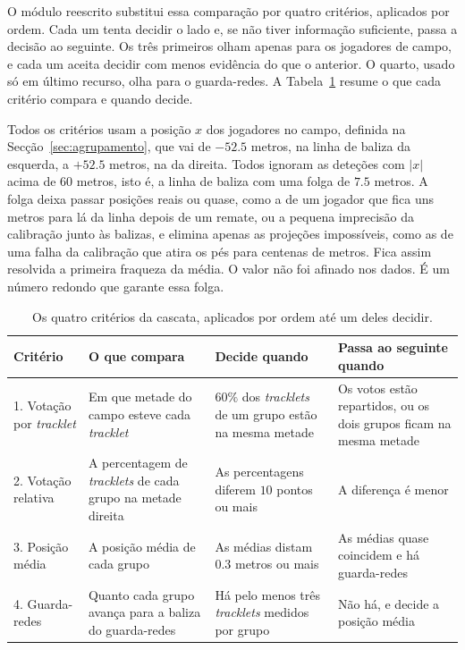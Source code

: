 O módulo reescrito substitui essa comparação por quatro critérios, aplicados por ordem. Cada um tenta decidir o lado e, se não tiver informação suficiente, passa a decisão ao seguinte. Os três primeiros olham apenas para os jogadores de campo, e cada um aceita decidir com menos evidência do que o anterior. O quarto, usado só em último recurso, olha para o guarda-redes. A Tabela~\ref{tab:cascata} resume o que cada critério compara e quando decide.

Todos os critérios usam a posição $x$ dos jogadores no campo, definida na Secção~\ref{sec:agrupamento}, que vai de $-52.5$ metros, na linha de baliza da esquerda, a $+52.5$ metros, na da direita. Todos ignoram as deteções com $|x|$ acima de $60$ metros, isto é, a linha de baliza com uma folga de $7.5$ metros. A folga deixa passar posições reais ou quase, como a de um jogador que fica uns metros para lá da linha depois de um remate, ou a pequena imprecisão da calibração junto às balizas, e elimina apenas as projeções impossíveis, como as de uma falha da calibração que atira os pés para centenas de metros. Fica assim resolvida a primeira fraqueza da média. O valor não foi afinado nos dados. É um número redondo que garante essa folga.

\begin{table}[H]
    \centering
    \caption{Os quatro critérios da cascata, aplicados por ordem até um deles decidir.}
    \label{tab:cascata}
    \small
    \begin{tabular}{|l|p{3.6cm}|p{3.2cm}|p{3.2cm}|}
        \hline
        \textbf{Critério} & \textbf{O que compara} & \textbf{Decide quando} & \textbf{Passa ao seguinte quando} \\
        \hline
        1. Votação por \emph{tracklet} & Em que metade do campo esteve cada \emph{tracklet} & $60\%$ dos \emph{tracklets} de um grupo estão na mesma metade & Os votos estão repartidos, ou os dois grupos ficam na mesma metade \\
        \hline
        2. Votação relativa & A percentagem de \emph{tracklets} de cada grupo na metade direita & As percentagens diferem $10$ pontos ou mais & A diferença é menor \\
        \hline
        3. Posição média & A posição média de cada grupo & As médias distam $0.3$ metros ou mais & As médias quase coincidem e há guarda-redes \\
        \hline
        4. Guarda-redes & Quanto cada grupo avança para a baliza do guarda-redes & Há pelo menos três \emph{tracklets} medidos por grupo & Não há, e decide a posição média \\
        \hline
    \end{tabular}
\end{table}

